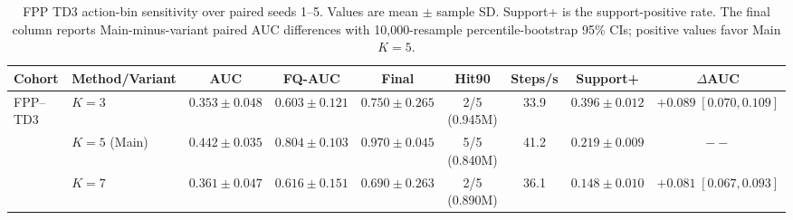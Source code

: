 \begin{table}[t]
\centering
\small
\setlength{\tabcolsep}{2pt}
\begin{tabular}{llccccccc}
\toprule
Cohort & Method/Variant & AUC & FQ-AUC & Final & Hit90 & Steps/s & Support+ & $\Delta$AUC \\
\midrule
FPP--TD3 & $K=3$ & $0.353 \pm 0.048$ & $0.603 \pm 0.121$ & $0.750 \pm 0.265$ & 2/5 (0.945M) & 33.9 & $0.396 \pm 0.012$ & $+0.089\; [0.070,0.109]$ \\
 & $K=5$ (Main) & $0.442 \pm 0.035$ & $0.804 \pm 0.103$ & $0.970 \pm 0.045$ & 5/5 (0.840M) & 41.2 & $0.219 \pm 0.009$ & $--$ \\
 & $K=7$ & $0.361 \pm 0.047$ & $0.616 \pm 0.151$ & $0.690 \pm 0.263$ & 2/5 (0.890M) & 36.1 & $0.148 \pm 0.010$ & $+0.081\; [0.067,0.093]$ \\
\bottomrule
\end{tabular}
\caption{FPP TD3 action-bin sensitivity over paired seeds 1--5. Values are mean $\pm$ sample SD. Support+ is the support-positive rate. The final column reports Main-minus-variant paired AUC differences with 10,000-resample percentile-bootstrap 95\% CIs; positive values favor Main $K=5$.}
\label{tab:supp-action-bin-sensitivity}
\end{table}
